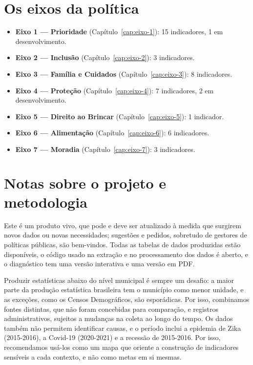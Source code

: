 \section{Os eixos da política}

\begin{itemize}

\item \textbf{Eixo 1 --- Prioridade} (Capítulo~\ref{cap:eixo-1}): 15 indicadores, 1 em desenvolvimento.

\item \textbf{Eixo 2 --- Inclusão} (Capítulo~\ref{cap:eixo-2}): 3 indicadores.

\item \textbf{Eixo 3 --- Família e Cuidados} (Capítulo~\ref{cap:eixo-3}): 8 indicadores.

\item \textbf{Eixo 4 --- Proteção} (Capítulo~\ref{cap:eixo-4}): 7 indicadores, 2 em desenvolvimento.

\item \textbf{Eixo 5 --- Direito ao Brincar} (Capítulo~\ref{cap:eixo-5}): 1 indicador.

\item \textbf{Eixo 6 --- Alimentação} (Capítulo~\ref{cap:eixo-6}): 6 indicadores.

\item \textbf{Eixo 7 --- Moradia} (Capítulo~\ref{cap:eixo-7}): 3 indicadores.

\end{itemize}

\section{Notas sobre o projeto e metodologia}\label{sec:notas-metodologia}

Este é um produto vivo, que pode e deve ser atualizado à medida que surgirem novos dados ou novas necessidades; sugestões e pedidos, sobretudo de gestores de políticas públicas, são bem-vindos. Todas as tabelas de dados produzidas estão disponíveis, o código usado na extração e no processamento dos dados é aberto, e o diagnóstico tem uma versão interativa e uma versão em PDF.

Produzir estatísticas abaixo do nível municipal é sempre um desafio: a maior parte da produção estatística brasileira tem o município como menor unidade, e as exceções, como os Censos Demográficos, são esporádicas. Por isso, combinamos fontes distintas, que não foram concebidas para comparação, e registros administrativos, sujeitos a mudanças na coleta ao longo do tempo. Os dados também não permitem identificar causas, e o período inclui a epidemia de Zika (2015-2016), a Covid-19 (2020-2021) e a recessão de 2015-2016. Por isso, recomendamos usá-los como um mapa que oriente a construção de indicadores sensíveis a cada contexto, e não como metas em si mesmas.

